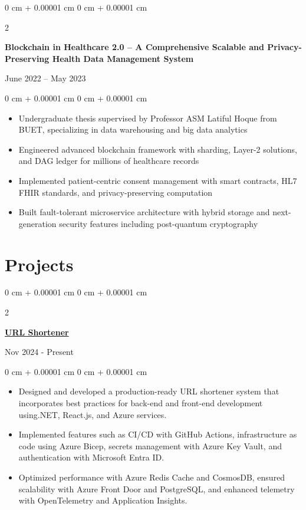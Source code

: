 \documentclass[10pt, letterpaper]{article}
\newenvironment{highlights}{
    \begin{itemize}[
        topsep=0.10 cm,
        parsep=0.10 cm,
        partopsep=0pt,
        itemsep=0pt,
        leftmargin=0 cm + 10pt
    ]
}{
    \end{itemize}
} %
\newenvironment{onecolentry}{
    \begin{adjustwidth}{
        0 cm + 0.00001 cm
    }{
        0 cm + 0.00001 cm
    }
}{
    \end{adjustwidth}
} %
\newenvironment{twocolentry}[2][]{
    \onecolentry
    \def\secondColumn{#2}
    \setcolumnwidth{\fill, 4.5 cm}
    \begin{paracol}{2}
}{
    \switchcolumn \raggedleft \secondColumn
    \end{paracol}
    \endonecolentry
} %
\begin{document}
\begin{twocolentry}{
    {June 2022 – May 2023}
}
    \textbf{Blockchain in Healthcare 2.0 -- A Comprehensive Scalable and Privacy-Preserving Health Data Management System}
\end{twocolentry}

\begin{onecolentry}
    \begin{highlights}
        \item Undergraduate thesis supervised by Professor ASM Latiful Hoque from BUET, specializing in data warehousing and big data analytics
        \item Engineered advanced blockchain framework with sharding, Layer-2 solutions, and DAG ledger for millions of healthcare records
        \item Implemented patient-centric consent management with smart contracts, HL7 FHIR standards, and privacy-preserving computation
        \item Built fault-tolerant microservice architecture with hybrid storage and next-generation security features including post-quantum cryptography
    \end{highlights}
\end{onecolentry}

\section{Projects}
               \begin{twocolentry}{
            {Nov 2024 - Present}
        }
            \href{https://github.com/thromel/URLShortener}{\textbf{URL Shortener}}
        \end{twocolentry}
        \begin{onecolentry}
            \begin{highlights}
                
                    \item Designed and developed a production-ready URL shortener system that incorporates best practices for back-end and front-end development using.NET, React.js, and Azure services.
	            \item Implemented features such as CI/CD with GitHub Actions, infrastructure as code using Azure Bicep, secrets management with Azure Key Vault, and authentication with Microsoft Entra ID.
	           \item Optimized performance with Azure Redis Cache and CosmosDB, ensured scalability with Azure Front Door and PostgreSQL, and enhanced telemetry with OpenTelemetry and Application Insights.
                \end{highlights}
                
        \end{onecolentry}
\end{document}
